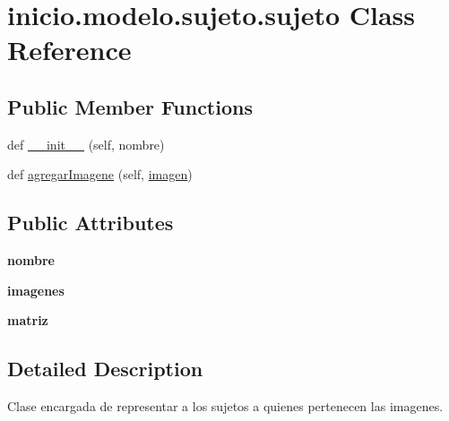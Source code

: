 \hypertarget{classinicio_1_1modelo_1_1sujeto_1_1sujeto}{}\section{inicio.\+modelo.\+sujeto.\+sujeto Class Reference}
\label{classinicio_1_1modelo_1_1sujeto_1_1sujeto}
\subsection*{Public Member Functions}
\begin{DoxyCompactItemize}
\item 
def \hyperlink{classinicio_1_1modelo_1_1sujeto_1_1sujeto_adc5fdb70533f566da487a316f753a0e8}{\+\_\+\+\_\+init\+\_\+\+\_\+} (self, nombre)
\item 
def \hyperlink{classinicio_1_1modelo_1_1sujeto_1_1sujeto_a6f4b6d7118b152c714e87d5c7e38d60a}{agregar\+Imagene} (self, \hyperlink{classinicio_1_1modelo_1_1imagen_1_1imagen}{imagen})
\end{DoxyCompactItemize}
\subsection*{Public Attributes}
\begin{DoxyCompactItemize}
\item 
\mbox{\label{classinicio_1_1modelo_1_1sujeto_1_1sujeto_ac67e083c0bbdd0266c6d16d70e481199}} 
{\bfseries nombre}
\item 
\mbox{\label{classinicio_1_1modelo_1_1sujeto_1_1sujeto_a20cee61c3e73eb44582e2a14720dd467}} 
{\bfseries imagenes}
\item 
\mbox{\label{classinicio_1_1modelo_1_1sujeto_1_1sujeto_aa0f06102e3b69e1820ab6192926eae54}} 
{\bfseries matriz}
\end{DoxyCompactItemize}


\subsection{Detailed Description}
\begin{DoxyVerb}Clase encargada de representar a los sujetos a quienes pertenecen las imagenes.
\end{DoxyVerb}
 

